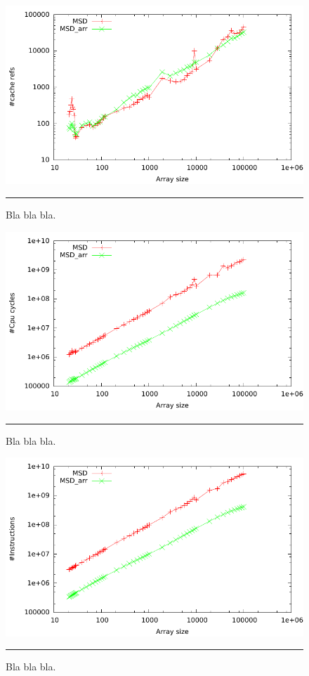 \begin{figure}[htbp]
	\centering
		\includegraphics[width=\textwidth]{./Figures/Project2b/Cache_refs.pdf}
		\rule{35em}{0.5pt}
	\caption[Cache refs]{
	Bla bla bla.
	}
	\label{fig:Cache_refs}
\end{figure}



\begin{figure}[htbp]
	\centering
		\includegraphics[width=\textwidth]{./Figures/Project2b/Cpu_cycles.pdf}
		\rule{35em}{0.5pt}
	\caption[CPU cycles]{
	Bla bla bla.
	}
	\label{fig:Cpu_cycles}
\end{figure}


\begin{figure}[htbp]
	\centering
		\includegraphics[width=\textwidth]{./Figures/Project2b/Instructions.pdf}
		\rule{35em}{0.5pt}
	\caption[Instructions]{
	Bla bla bla.
	}
	\label{fig:Instructions}
\end{figure}


